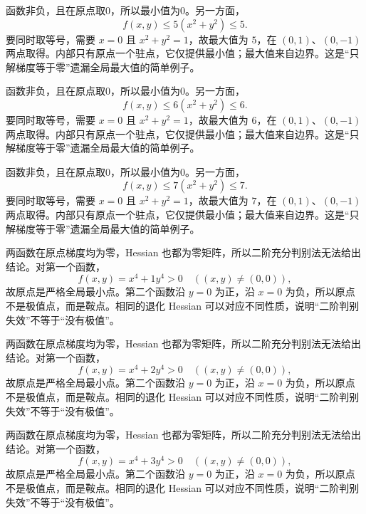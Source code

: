 \documentclass[UTF8,12pt,a4paper,fontset=fandol]{ctexart}
\begin{document}
\begin{solve}\label{ans:c35q16}
函数非负，且在原点取0，所以最小值为0。另一方面，
\[
f(x,y)\le 5(x^2+y^2)\le 5.
\]
要同时取等号，需要 $x=0$ 且 $x^2+y^2=1$，故最大值为 $5$，在 $(0,1)$、$(0,-1)$ 两点取得。内部只有原点一个驻点，它仅提供最小值；最大值来自边界。这是“只解梯度等于零”遗漏全局最大值的简单例子。
\end{solve}

\begin{solve}\label{ans:c35q17}
函数非负，且在原点取0，所以最小值为0。另一方面，
\[
f(x,y)\le 6(x^2+y^2)\le 6.
\]
要同时取等号，需要 $x=0$ 且 $x^2+y^2=1$，故最大值为 $6$，在 $(0,1)$、$(0,-1)$ 两点取得。内部只有原点一个驻点，它仅提供最小值；最大值来自边界。这是“只解梯度等于零”遗漏全局最大值的简单例子。
\end{solve}

\begin{solve}\label{ans:c35q18}
函数非负，且在原点取0，所以最小值为0。另一方面，
\[
f(x,y)\le 7(x^2+y^2)\le 7.
\]
要同时取等号，需要 $x=0$ 且 $x^2+y^2=1$，故最大值为 $7$，在 $(0,1)$、$(0,-1)$ 两点取得。内部只有原点一个驻点，它仅提供最小值；最大值来自边界。这是“只解梯度等于零”遗漏全局最大值的简单例子。
\end{solve}

\begin{solve}\label{ans:c35q19}
两函数在原点梯度均为零，Hessian 也都为零矩阵，所以二阶充分判别法无法给出结论。对第一个函数，
\[
f(x,y)=x^4+1y^4>0\quad((x,y)\ne(0,0)),
\]
故原点是严格全局最小点。第二个函数沿 $y=0$ 为正，沿 $x=0$ 为负，所以原点不是极值点，而是鞍点。相同的退化 Hessian 可以对应不同性质，说明“二阶判别失效”不等于“没有极值”。
\end{solve}

\begin{solve}\label{ans:c35q20}
两函数在原点梯度均为零，Hessian 也都为零矩阵，所以二阶充分判别法无法给出结论。对第一个函数，
\[
f(x,y)=x^4+2y^4>0\quad((x,y)\ne(0,0)),
\]
故原点是严格全局最小点。第二个函数沿 $y=0$ 为正，沿 $x=0$ 为负，所以原点不是极值点，而是鞍点。相同的退化 Hessian 可以对应不同性质，说明“二阶判别失效”不等于“没有极值”。
\end{solve}

\begin{solve}\label{ans:c35q21}
两函数在原点梯度均为零，Hessian 也都为零矩阵，所以二阶充分判别法无法给出结论。对第一个函数，
\[
f(x,y)=x^4+3y^4>0\quad((x,y)\ne(0,0)),
\]
故原点是严格全局最小点。第二个函数沿 $y=0$ 为正，沿 $x=0$ 为负，所以原点不是极值点，而是鞍点。相同的退化 Hessian 可以对应不同性质，说明“二阶判别失效”不等于“没有极值”。
\end{solve}
\end{document}
